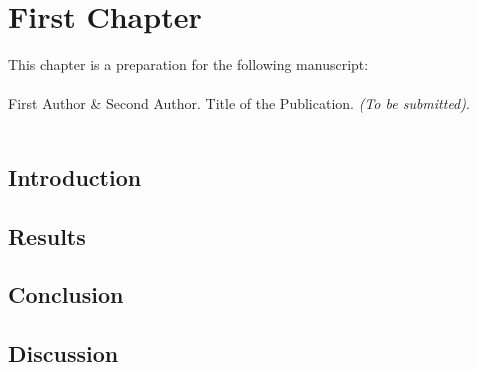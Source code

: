 \chapter{First Chapter}
\label{chapter:first-chapter}

\vspace{3cm}

This chapter is a preparation for the following manuscript:\\
\\
First Author \& 
Second Author. Title of the Publication. \textit{(To be submitted)}.\\
\\

\clearpage

\section{Introduction}
\lipsum[1-10]

\section{Results}
\lipsum[1-10]

\section{Conclusion}
\lipsum[1-10]

\section{Discussion}
\lipsum[1-10]

